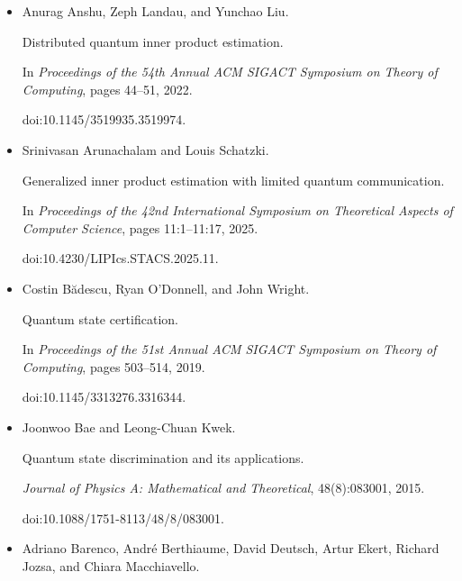 \documentclass[10pt,a4paper]{article}
\begin{document}
\begin{itemize}


\item[] 
[1]

Anurag Anshu, Zeph Landau, and Yunchao Liu.


Distributed quantum inner product estimation.


In \emph{Proceedings of the 54th Annual ACM SIGACT Symposium on Theory
of Computing}, pages 44–51, 2022.


doi:10.1145/3519935.3519974.





\item[] 
[2]

Srinivasan Arunachalam and Louis Schatzki.


Generalized inner product estimation with limited quantum
communication.


In \emph{Proceedings of the 42nd International Symposium on
Theoretical Aspects of Computer Science}, pages 11:1–11:17, 2025.


doi:10.4230/LIPIcs.STACS.2025.11.





\item[] 
[3]

Costin Bădescu, Ryan O’Donnell, and John Wright.


Quantum state certification.


In \emph{Proceedings of the 51st Annual ACM SIGACT Symposium on Theory
of Computing}, pages 503–514, 2019.


doi:10.1145/3313276.3316344.





\item[] 
[4]

Joonwoo Bae and Leong-Chuan Kwek.


Quantum state discrimination and its applications.


\emph{Journal of Physics A: Mathematical and Theoretical},
48(8):083001, 2015.


doi:10.1088/1751-8113/48/8/083001.





\item[] 
[5]

Adriano Barenco, André Berthiaume, David Deutsch, Artur Ekert, Richard
Jozsa, and Chiara Macchiavello.



\end{itemize}
\end{document}
